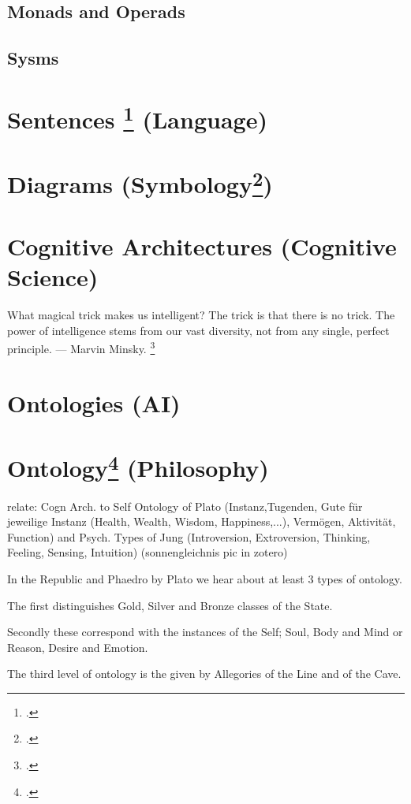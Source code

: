\documentclass[12pt,a4paper]{article}
\begin{document}
\subsection{Monads and Operads}

\subsection{Sysms}

\section{Sentences \footcite{Carnie2012} (Language)}

\section{Diagrams (Symbology\footcite{Jung1964})} 

\section{Cognitive Architectures (Cognitive Science)}
What magical trick makes us intelligent? The trick is that there is no trick. The power of intelligence stems from our vast diversity, not from any single, perfect principle. — Marvin Minsky. \footcite[308]{Minsky1988}

\section{Ontologies (AI)}

\section{Ontology\footcite{Platon2010} (Philosophy)}
relate: Cogn Arch. to Self Ontology of Plato (Instanz,Tugenden, Gute für jeweilige Instanz (Health, Wealth, Wisdom, Happiness,...), Vermögen, Aktivität, Function) and Psych. Types of Jung (Introversion, Extroversion, Thinking, Feeling, Sensing, Intuition) (sonnengleichnis pic in zotero)

In the Republic and Phaedro by Plato we hear about at least 3 types of ontology. 

The first distinguishes Gold, Silver and Bronze classes of the State.

Secondly these correspond with the instances of the Self; Soul, Body and Mind or Reason, Desire and Emotion.

The third level of ontology is the given by Allegories of the Line and of the Cave.
\end{document}
